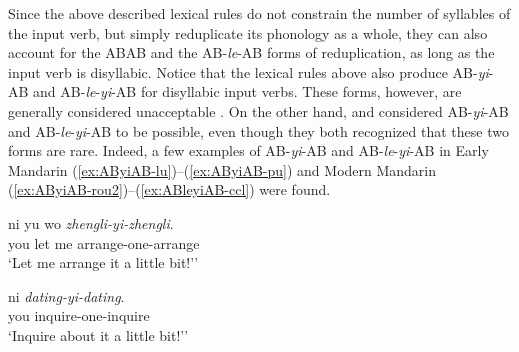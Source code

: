 \documentclass[11pt,a4paper,fleqn,draft]{article}
\newcommand{\type}[1]{{\normalfont\itshape #1\/}}
\newcommand{\phonliste}[1]{%
\mbox{%
$%
%
\left\langle \mbox{\normalfont\itshape#1} \right\rangle%
$%
}%
}
\let\textbf\emph
\begin{document}



Since the above described lexical rules do not constrain the number of syllables of the input verb, but simply reduplicate its phonology  as a whole,
they can also account for the ABAB and the AB-\emph{le}-AB forms of reduplication,
as long as the input verb is disyllabic.
Notice that  the lexical rules above also produce AB-\emph{yi}-AB and AB\hyp{}\emph{le}\hyp{}\emph{yi}\hyp{}AB for disyllabic input verbs.
These forms, however, are generally considered unacceptable \citetext{\citealp[160]{BascianoMelloni2017}, \citealp[275--276]{Hong1999}, \citealp[30]{LiThompson1981}, \citealp[239]{YangWei2017}}.
On the other hand, \citet[269]{Fan1964} and \citet[143]{Sui2018} considered AB-\emph{yi}-AB and AB-\emph{le}-\emph{yi}-AB to be possible, even though they both recognized that these two forms are rare.
Indeed, a few examples of AB-\emph{yi}-AB and AB-\emph{le}-\emph{yi}-AB in Early Mandarin (\ref{ex:AByiAB-lu})--(\ref{ex:AByiAB-pu}) and Modern Mandarin (\ref{ex:AByiAB-rou2})--(\ref{ex:ABleyiAB-ccl}) were found.

\ea
 \ea\label{ex:AByiAB-lu}
 \gll ni yu wo \textbf{zhengli-yi-zhengli}.\footnotemark\\
 you let me arrange-one-arrange\\
 \glt `Let me arrange it a little bit!''
 
 \ex\label{ex:AByiAB-pu}
 \gll ni \textbf{dating-yi-dating}.\footnotemark\\
 you inquire-one-inquire\\
 \glt `Inquire about it a little bit!''
 
\end{document}
